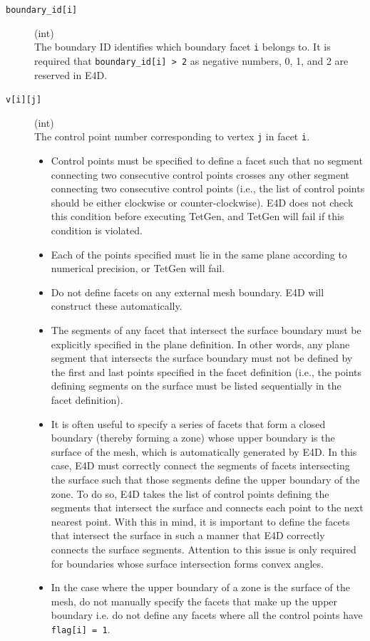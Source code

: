 \documentclass[a4paper,12pt]{article}
\begin{document}
\begin{description}
    \item[\texttt{boundary\_id[i]}] (int)\hfill \\
    The boundary ID identifies which boundary facet \texttt{i} belongs to. It is required that \texttt{boundary\_id[i] > 2} as negative numbers, 0, 1, and 2 are reserved in E4D.

    \item[\texttt{v[i][j]}] (int)\hfill \\
    The control point number corresponding to vertex \texttt{j} in facet \texttt{i}.

    \begin{itemize}
        \item Control points must be specified to define a facet such that no segment connecting two consecutive control points crosses any other segment connecting two consecutive control points (i.e., the list of control points should be either clockwise or counter-clockwise). E4D does not check this condition before executing TetGen, and TetGen will fail if this condition is violated.
        \item Each of the points specified must lie in the same plane according to numerical precision, or TetGen will fail.
        \item Do not define facets on any external mesh boundary. E4D will construct these automatically.
        \item The segments of any facet that intersect the surface boundary must be explicitly specified in the plane definition. In other words, any plane segment that intersects the surface boundary must not be defined by the first and last points specified in the facet definition (i.e., the points defining segments on the surface must be listed sequentially in the facet definition).
        \item It is often useful to specify a series of facets that form a closed boundary (thereby forming a zone) whose upper boundary is the surface of the mesh, which is automatically generated by E4D. In this case, E4D must correctly connect the segments of facets intersecting the surface such that those segments define the upper boundary of the zone. To do so, E4D takes the list of control points defining the segments that intersect the surface and connects each point to the next nearest point. With this in mind, it is important to define the facets that intersect the surface in such a manner that E4D correctly connects the surface segments. Attention to this issue is only required for boundaries whose surface intersection forms convex angles.
        \item In the case where the upper boundary of a zone is the surface of the mesh, do not manually specify the facets that make up the upper boundary i.e. do not define any facets where all the control points have \texttt{flag[i] = 1}.
    \end{itemize}


\end{description}
\end{document}
